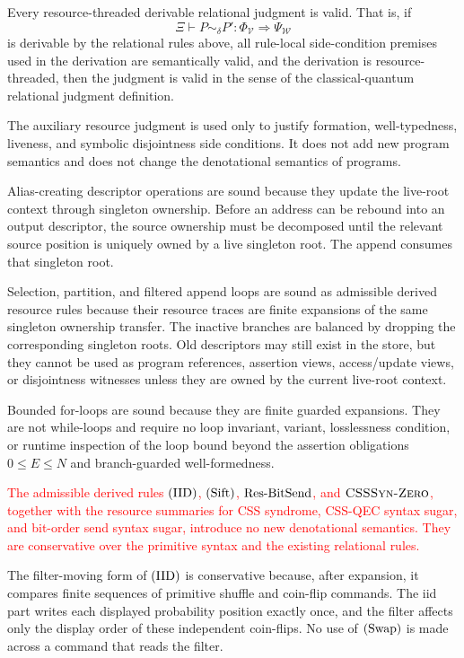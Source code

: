 \documentclass[acmsmall,screen,review,anonymous,nonacm]{acmart}
\theoremstyle{defn_style}
\begin{document}
\begin{theorem}[Soundness]
Every resource-threaded derivable relational judgment is valid. That is, if
\[
\Xi
\vdash
P\sim_{\delta}P':
\Phi_{\mathcal V}
\Longrightarrow
\Psi_{\mathcal W}
\]
is derivable by the relational rules above, all rule-local side-condition
premises used in the derivation are semantically valid, and the derivation is
resource-threaded, then the judgment is valid in the sense of the
classical-quantum relational judgment definition.

The auxiliary resource judgment is used only to justify formation,
well-typedness, liveness, and symbolic disjointness side conditions. It does
not add new program semantics and does not change the denotational semantics
of programs.

Alias-creating descriptor operations are sound because they update the
live-root context through singleton ownership. Before an address can be
rebound into an output descriptor, the source ownership must be decomposed
until the relevant source position is uniquely owned by a live singleton root.
The append consumes that singleton root.

Selection, partition, and filtered append loops are sound as admissible derived
resource rules because their resource traces are finite expansions of the same
singleton ownership transfer. The inactive branches are balanced by dropping
the corresponding singleton roots. Old descriptors may still exist in the store,
but they cannot be used as program references, assertion views,
access/update views, or disjointness witnesses unless they are owned by the
current live-root context.

Bounded for-loops are sound because they are finite guarded expansions. They
are not while-loops and require no loop invariant, variant, losslessness
condition, or runtime inspection of the loop bound beyond the assertion
obligations \(0\le E\le N\) and branch-guarded well-formedness.

\textcolor{red}{The admissible derived rules \({\rm (IID)}\), \({\rm (Sift)}\),
\({\rm Res\mbox{-}BitSend}\), and \(\textsc{CSSSyn-Zero}\), together with
the resource summaries for CSS syndrome, CSS-QEC syntax sugar, and
bit-order send syntax sugar, introduce no new denotational semantics. They
are conservative over the primitive syntax and the existing relational
rules.}


The filter-moving form of \({\rm (IID)}\) is conservative because, after
expansion, it compares finite sequences of primitive shuffle and coin-flip
commands.  The iid part writes each displayed probability position exactly
once, and the filter affects only the display order of these independent
coin-flips.  No use of \({\rm (Swap)}\) is made across a command that reads the
filter.


\end{theorem}
\end{document}
